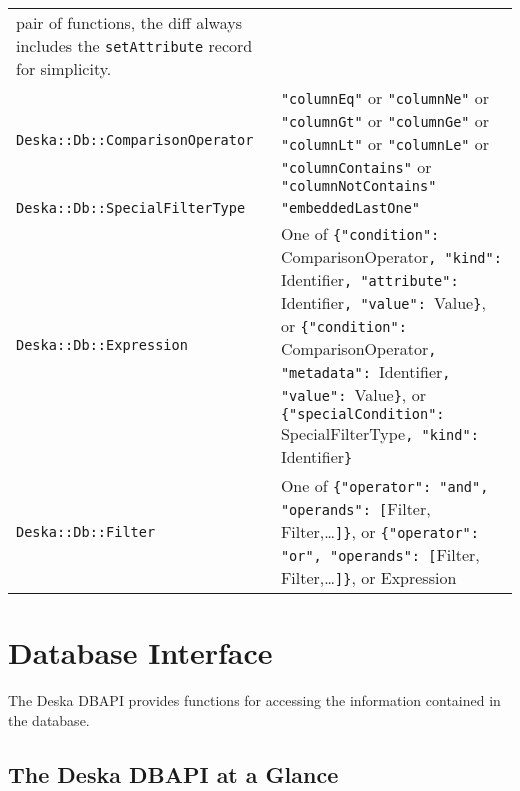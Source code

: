 \documentclass[deska]{subfiles}
\begin{document}
\begin{longtable}{ p{60mm} p{90mm} }
{        pair of functions, the diff always includes the {\tt setAttribute} record for simplicity.}
        \\
    {\tt Deska::Db::ComparisonOperator} &
        {\tt "columnEq"} or {\tt "columnNe"} or {\tt "columnGt"} or {\tt "columnGe"} or {\tt "columnLt"} or
        {\tt "columnLe"} or {\tt "columnContains"} or {\tt "columnNotContains"}
        \\
    {\tt Deska::Db::SpecialFilterType} &
        {\tt "embeddedLastOne"}
        \\
    {\tt Deska::Db::Expression} &
        One of \newline
        {\tt \{"condition": }ComparisonOperator{\tt, "kind": }Identifier{\tt, "attribute": }Identifier{\tt, "value":
        }Value{\tt \}}, \newline
        or \newline
        {\tt \{"condition": }ComparisonOperator{\tt, "metadata": }Identifier{\tt, "value": }Value{\tt \}}, \newline
        or \newline
        {\tt \{"specialCondition": }SpecialFilterType{\tt, "kind": }Identifier{\tt \}}
        \\
    {\tt Deska::Db::Filter} &
        One of \newline
        {\tt \{"operator": "and", "operands": [}Filter, Filter,\ldots{\tt]\}}, \newline
        or \newline
        {\tt \{"operator": "or", "operands": [}Filter, Filter,\ldots{\tt]\}}, \newline
        or \newline
        Expression

\end{longtable}

\section{Database Interface}

The Deska DBAPI provides functions for accessing the information contained in the database.

\subsection{The Deska DBAPI at a Glance}
\end{document}
